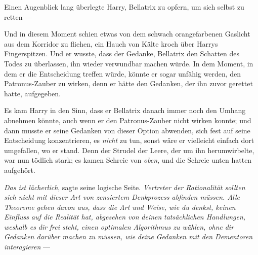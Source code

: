 Einen Augenblick lang überlegte Harry, Bellatrix zu opfern, um sich selbst zu retten —

Und in diesem Moment schien etwas von dem schwach orangefarbenen Gaslicht aus dem Korridor zu fliehen, ein Hauch von Kälte kroch über Harrys Fingerspitzen. Und er wusste, dass der Gedanke, Bellatrix den Schatten des Todes zu überlassen, ihn wieder verwundbar machen würde. In dem Moment, in dem er die Entscheidung treffen würde, könnte er sogar unfähig werden, den Patronus-Zauber zu wirken, denn er hätte den Gedanken, der ihn zuvor gerettet hatte, aufgegeben.

Es kam Harry in den Sinn, dass er Bellatrix danach immer noch den Umhang abnehmen könnte, auch wenn er den Patronus-Zauber nicht wirken konnte; und dann musste er seine Gedanken von dieser Option abwenden, sich fest auf seine Entscheidung konzentrieren, es \emph{nicht} zu tun, sonst wäre er vielleicht einfach dort umgefallen, wo er stand. Denn der Strudel der Leere, der um ihn herumwirbelte, war nun tödlich stark; es kamen Schreie von \emph{oben}, und die Schreie unten hatten aufgehört.

\emph{Das ist lächerlich}, sagte seine logische Seite. \emph{Vertreter der Rationalität sollten sich nicht mit dieser Art von zensiertem Denkprozess abfinden müssen. Alle Theoreme gehen davon aus, dass die Art und Weise, wie du denkst, keinen Einfluss auf die Realität hat, abgesehen von} \emph{deinen} \emph{tatsächlichen Handlungen, weshalb es} \emph{dir} \emph{frei steht, einen optimalen Algorithmus zu wählen, ohne} \emph{dir} \emph{Gedanken darüber machen zu müssen, wie} \emph{deine} \emph{Gedanken mit den Dementoren interagieren} —

